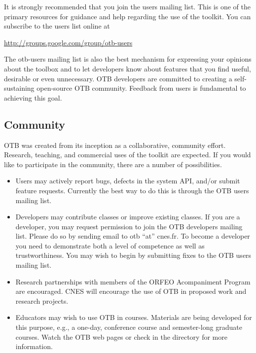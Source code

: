 
It is strongly recommended that you join the users mailing list. This is one
of the primary resources for guidance and help regarding the use of the
toolkit. You can subscribe to the users list online at

\begin{center}
\url{http://groups.google.com/group/otb-users}
\end{center}

The otb-users mailing list is also the best mechanism for expressing your
opinions about the toolbox and to let developers know about features that you
find useful, desirable or even unnecessary. OTB developers are committed to
creating a self-sustaining open-source OTB community. Feedback from users is
fundamental to achieving this goal.

\subsection{Community}
OTB was created from its inception as a collaborative, community
effort. Research, teaching, and commercial uses of the toolkit are
expected. If you would like to participate in the community, there are a
number of possibilities.

\begin{itemize}
       \item Users may actively report bugs, defects in the system API,
       and/or submit feature requests. Currently the best way to do this is
       through the OTB users mailing list.

       \item Developers may contribute classes or improve existing
       classes. If you are a developer, you may request permission to join
       the OTB developers mailing list. Please do so by sending email to
       otb ``at'' cnes.fr. To become a developer you need to
       demonstrate both a level of competence as well as
       trustworthiness. You may wish to begin by submitting fixes to the OTB
       users mailing list.

       \item Research partnerships with members of the ORFEO
       Acompaniment Program are encouraged. CNES will encourage the use of
       OTB in proposed work and research projects.


       \item Educators may wish to use OTB in courses. Materials are being
       developed for this purpose, e.g., a one-day, conference course and
       semester-long graduate courses. Watch the OTB web pages or check in
       the  directory for more information.
\end{itemize}


